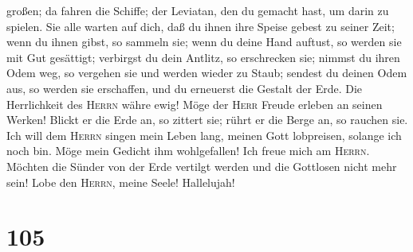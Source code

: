 großen;  da fahren die Schiffe; der Leviatan, den du
gemacht hast, um darin zu spielen.  Sie alle warten auf
dich, daß du ihnen ihre Speise gebest zu seiner Zeit; 
wenn du ihnen gibst, so sammeln sie; wenn du deine Hand auftust, so
werden sie mit Gut gesättigt;  verbirgst du dein Antlitz,
so erschrecken sie; nimmst du ihren Odem weg, so vergehen sie und werden
wieder zu Staub;  sendest du deinen Odem aus, so werden
sie erschaffen, und du erneuerst die Gestalt der Erde. 
Die Herrlichkeit des \textsc{Herrn} währe ewig! Möge der \textsc{Herr}
Freude erleben an seinen Werken!  Blickt er die Erde an,
so zittert sie; rührt er die Berge an, so rauchen sie. 
Ich will dem \textsc{Herrn} singen mein Leben lang, meinen Gott
lobpreisen, solange ich noch bin.  Möge mein Gedicht ihm
wohlgefallen! Ich freue mich am \textsc{Herrn}.  Möchten
die Sünder von der Erde vertilgt werden und die Gottlosen nicht mehr
sein! Lobe den \textsc{Herrn}, meine Seele! Hallelujah!

\hypertarget{section-104}{%
\section{105}\label{section-104}}

